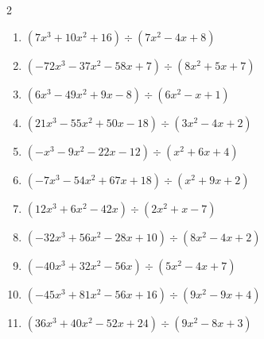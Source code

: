 \begin{multicols}{2}
\begin{enumerate}
        \phantom{$商 : x-8, \quad 剰余 : -4x-6$}

  \item $(7x^{3}+10x^{2}+16) \div (7x^{2}-4x+8)$

        \phantom{$商 : x+2, \quad 剰余 : 6x-3$}

  \item $(-72x^{3}-37x^{2}-58x+7) \div (8x^{2}+5x+7)$

        \phantom{$商 : -9x+1, \quad 剰余 : -x-4$}

  \item $(6x^{3}-49x^{2}+9x-8) \div (6x^{2}-x+1)$

        \phantom{$商 : x-8, \quad 剰余 : $}

  \item $(21x^{3}-55x^{2}+50x-18) \div (3x^{2}-4x+2)$

        \phantom{$商 : 7x-9, \quad 剰余 : 2x+1$}

\columnbreak %

  \item $(-x^{3}-9x^{2}-22x-12) \div (x^{2}+6x+4)$

        \phantom{$商 : -x-3, \quad 剰余 : 6x-1$}

  \item $(-7x^{3}-54x^{2}+67x+18) \div (x^{2}+9x+2)$

        \phantom{$商 : -7x+9, \quad 剰余 : -4x-8$}

  \item $(12x^{3}+6x^{2}-42x) \div (2x^{2}+x-7)$

        \phantom{$商 : 6x, \quad 剰余 : -x-2$}

  \item $(-32x^{3}+56x^{2}-28x+10) \div (8x^{2}-4x+2)$

        \phantom{$商 : -4x+5, \quad 剰余 : -8$}

  \item $(-40x^{3}+32x^{2}-56x) \div (5x^{2}-4x+7)$

        \phantom{$商 : -8x, \quad 剰余 : -7x-9$}

\columnbreak %

\resetques

  \item $(-45x^{3}+81x^{2}-56x+16) \div (9x^{2}-9x+4)$

        \phantom{$商 : -5x+4, \quad 剰余 : 2x$}

  \item $(36x^{3}+40x^{2}-52x+24) \div (9x^{2}-8x+3)$


\end{enumerate}
\end{multicols}
